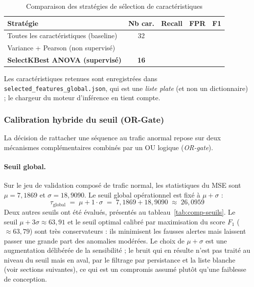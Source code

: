 \begin{table}[H]
\centering
\caption{Comparaison des stratégies de sélection de caractéristiques}
\label{tab:comp-selection}
\small
\begin{tabularx}{\textwidth}{@{}>{\raggedright\arraybackslash}Xcccc@{}}
\toprule
\textbf{Stratégie} & \textbf{Nb car.} & \textbf{Recall} & \textbf{FPR} & \textbf{F1} \\
\midrule
Toutes les caractéristiques (baseline) & 32 & \A{} & \A{} & \A{} \\
Variance + Pearson (non supervisé) & \A{} & \A{} & \A{} & \A{} \\
\textbf{SelectKBest ANOVA (supervisé)} & \textbf{16} & \textbf{\A{}} & \textbf{\A{}} & \textbf{\A{}} \\
\bottomrule
\end{tabularx}
\end{table}


Les caractéristiques retenues sont enregistrées dans \texttt{selected\_features\_global.json}, qui est une \emph{liste plate} (et non un dictionnaire) ; le chargeur du moteur d'inférence en tient compte.

\subsubsection{Calibration hybride du seuil (OR-Gate)}
\label{sec:calibration}

La décision de rattacher une séquence au trafic anormal repose sur deux mécanismes complémentaires combinés par un OU logique (\emph{OR-gate}).

\paragraph{Seuil global.} Sur le jeu de validation composé de trafic normal, les statistiques du MSE sont $\mu = 7{,}1869$ et $\sigma = 18{,}9090$. Le seuil global opérationnel est fixé à $\mu+\sigma$ :
\begin{equation}
\tau_{\text{global}} \;=\; \mu + 1\cdot\sigma \;=\; 7{,}1869 + 18{,}9090 \;\approx\; 26{,}0959
\label{eq:seuil}
\end{equation}
Deux autres seuils ont été évalués, présentés au tableau~\ref{tab:comp-seuils}. Le seuil $\mu+3\sigma \approx 63{,}91$ et le seuil optimal calibré par maximisation du score $F_1$ ($\approx 63{,}79$) sont très conservateurs : ils minimisent les fausses alertes mais laissent passer une grande part des anomalies modérées. Le choix de $\mu+\sigma$ est une augmentation délibérée de la sensibilité ; le bruit qui en résulte n'est pas traité au niveau du seuil mais en aval, par le filtrage par persistance et la liste blanche (voir sections suivantes), ce qui est un compromis assumé plutôt qu'une faiblesse de conception.

